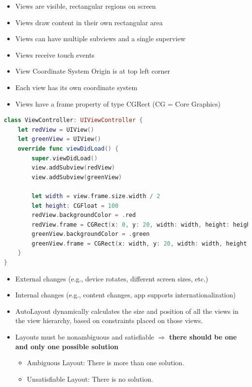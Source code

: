 \begin{breakbox}
\begin{itemize}
\tightlist
\item
  Views are visible, rectangular regions on screen
\item
  Views draw content in their own rectangular area
\item
  Views can have multiple subviews and a single superview
\item
  Views receive touch events
\item
  View Coordinate System Origin is at top left corner
\item
  Each view has its own coordinate system
\item
  Views have a frame property of type CGRect (CG = Core Graphics)
\end{itemize}

\begin{lstlisting}[language=swift]
class ViewController: UIViewController {
    let redView = UIView()
    let greenView = UIView()
    override func viewDidLoad() {
        super.viewDidLoad()
        view.addSubview(redView)
        view.addSubview(greenView)
        
        let width = view.frame.size.width / 2
        let height: CGFloat = 100
        redView.backgroundColor = .red
        redView.frame = CGRect(x: 0, y: 20, width: width, height: height)
        greenView.backgroundColor = .green
        greenView.frame = CGRect(x: width, y: 20, width: width, height: height)
    }
}
\end{lstlisting}
\end{breakbox}

\begin{breakbox}


\begin{itemize}
\tightlist
\item
  External changes (e.g., device rotates, different screen sizes, etc.)
\item
  Internal changes (e.g., content changes, app supports
  internationalization)
\item
  AutoLayout dynamically calculates the size and position of all the
  views in the view hierarchy, based on constraints placed on those
  views.
\item
  Layouts must be nonambiguous and satisfiable $\Rightarrow$ \textbf{there should be
  one and only one possible solution}

  \begin{itemize}
  \tightlist
  \item
    Ambiguous Layout: There is more than one solution.
  \item
    Unsatisfiable Layout: There is no solution.
  \end{itemize}
\end{itemize}

\end{breakbox}

